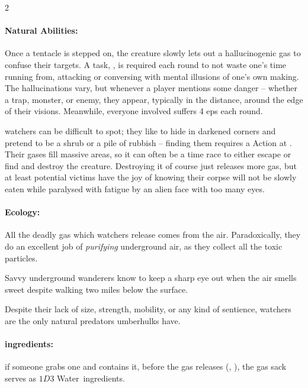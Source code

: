 \begin{multicols}{2}
\paragraph{Natural Abilities:}
Once a tentacle is stepped on, the creature slowly lets out a hallucinogenic gas to confuse their targets.
A  task, \tn[10], is required each round to not waste one's time running from, attacking or conversing with mental illusions of one's own making.
The hallucinations vary, but whenever a player mentions some danger -- whether a trap, monster, or enemy, they appear, typically in the distance, around the edge of their visions.
Meanwhile, everyone involved suffers 4 \glspl{ep} each round.

\Glspl{watcher} can be difficult to spot; they like to hide in darkened corners and pretend to be a shrub or a pile of rubbish -- finding them requires a  Action at \tn[10].
Their gases fill massive areas, so it can often be a time race to either escape or find and destroy the creature.
Destroying it of course just releases more gas, but at least potential victims have the joy of knowing their corpse will not be slowly eaten while paralysed with fatigue by an alien face with too many eyes.

\paragraph{Ecology:}
All the deadly gas which \glspl{watcher} release comes from the air.
Paradoxically, they do an excellent job of \emph{purifying} underground air, as they collect all the toxic particles.

Savvy underground wanderers know to keep a sharp eye out when the air smells sweet despite walking two miles below the surface.

Despite their lack of size, strength, mobility, or any kind of sentience, \glspl{watcher} are the only natural predators umberhulks have.


\watcher

\paragraph{\Glspl{ingredient}:}
if someone grabs one and contains it, before the gas releases (, \tn[10]), the gas sack serves as $1D3$ Water~\glspl{ingredient}.


\end{multicols}
